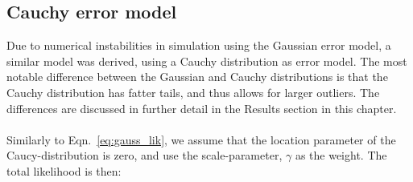 \subsection{Cauchy error model}
Due to numerical instabilities in simulation using the Gaussian error model, a similar model was derived, using a Cauchy distribution as error model. The most notable difference between the Gaussian and Cauchy distributions is that the Cauchy distribution has fatter tails, and thus allows for larger outliers. The differences are  discussed in further detail in the Results section in this chapter.
\\\\Similarly to Eqn.~\ref{eq:gauss_lik}, we assume that the location parameter of the Caucy-distribution is zero, and  use the scale-parameter, $\gamma$ as the weight. The total likelihood is then:

